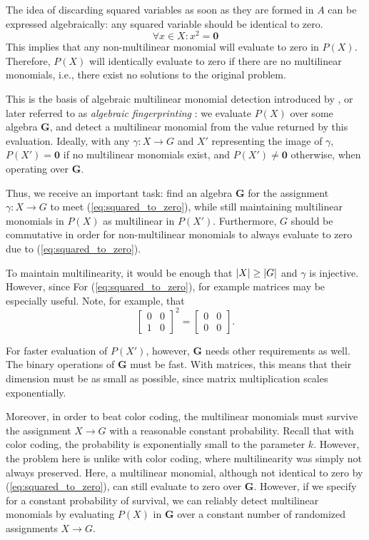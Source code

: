 The idea of discarding squared variables as soon as they are formed in $A$ 
can be expressed algebraically: any squared variable should be identical to
zero. 
\begin{equation}
  \label{eq:squared_to_zero}
\forall x \in X: x^2 = \mathbf{0}
\end{equation}
This implies that any non-multilinear monomial will evaluate to zero in $P(X)$. 
Therefore, $P(X)$ will identically evaluate to zero if there are no multilinear monomials, 
i.e., there exist no solutions to the original problem.

This is the basis of algebraic multilinear monomial detection introduced by 
\citeauthor{Koutis08} \cite{Koutis08}, or later referred to as \emph{algebraic fingerprinting} \cite{KouWil15}: 
we evaluate $P(X)$ over some algebra $\mathbf{G}$, and detect a multilinear monomial from 
the value returned by this evaluation. Ideally, with any $\gamma \colon X \to G$ and $X'$ representing 
the image of $\gamma$, 
$P(X') = \mathbf{0}$ if no multilinear monomials exist, and 
$P(X') \neq \mathbf{0}$ otherwise, when operating over $\mathbf{G}$.

Thus, we receive an important task: find an algebra $\mathbf{G}$ for 
the assignment $\gamma \colon X \to G$ to meet (\ref{eq:squared_to_zero}), 
while still maintaining multilinear monomials in $P(X)$ as multilinear in $P(X')$. 
Furthermore, 
$G$ should be commutative in order for non-multilinear monomials to always 
evaluate to zero due to (\ref{eq:squared_to_zero}).

To maintain multilinearity, 
it would be enough that ${\left\vert X\right\vert} \geq {\left\vert G\right\vert}$ and $\gamma$ is injective. 
However, since 
For (\ref{eq:squared_to_zero}), for example
matrices may be especially useful. Note, for example, that 
\[
\begin{bmatrix} 
  0 & 0 \\ 
  1 & 0 
\end{bmatrix}^2 = 
\begin{bmatrix} 
  0 & 0 \\ 
  0 & 0 
\end{bmatrix}.
\]

For faster evaluation of $P(X')$, however, $\mathbf{G}$ needs other requirements as well. 
The binary operations of $\mathbf{G}$ must be fast. With matrices, this means that their 
dimension must be as small as possible, since matrix multiplication scales exponentially.

Moreover, in order to beat color coding, 
the multilinear monomials must 
survive the assignment $X \to G$ with a reasonable constant probability. Recall that 
with color coding, the probability is exponentially small to the parameter $k$. However, 
the problem here is unlike with color coding, where multilinearity was simply not 
always preserved. Here, a multilinear monomial, although not identical to zero by (\ref{eq:squared_to_zero}), 
can still evaluate to zero over $\mathbf{G}$. However, if we specify for a constant 
probability of survival, we can reliably detect multilinear monomials by evaluating 
$P(X)$ in $\mathbf{G}$ over a constant number of randomized assignments $X \to G$.

